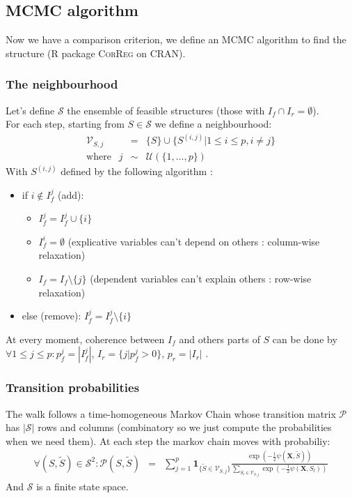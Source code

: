 \documentclass[11pt,a4paper]{article}
\begin{document}

\subsection{MCMC algorithm}
	Now we have a comparison criterion, we define an MCMC algorithm to find the structure (R package \textsc{CorReg} on CRAN). 
	\subsubsection{The neighbourhood}
	Let's define $\mathcal{S}$ the ensemble of feasible structures (those with $I_f\cap I_r=\emptyset$).
	\\
	For each step, starting from $S \in \mathcal{S}$ we define a neighbourhood:
		\begin{eqnarray}
		\mathcal{V}_{S,j}&=& \{S \}\cup \{ S^{(i,j)} |1\leq i \leq p, i\neq j  \} \\
		\textrm{where }\ \ j &\sim & \mathcal{U}(\{1,\dots,p\}) 
	\end{eqnarray}	
	With $S^{(i,j)}$ defined by the following algorithm :
	\begin{itemize}
		\item if $i \notin I_f^j$ (add): 
			\begin{itemize}
				\item $I_f^j=I_f^j\cup \{i\}$
				\item $I_f^i=\emptyset$ (explicative variables can't depend on others : column-wise relaxation)
				\item $I_f=I_f \setminus \{j\}$ (dependent variables can't explain others : row-wise relaxation) 
			\end{itemize}			 
		\item else (remove): $I_f^j=I_f^j\setminus \{i\}$
	\end{itemize}
	
	\smallskip
	At every moment, coherence between $I_f$ and others parts of $S$ can be done by $\forall 1\leq j\leq p :  p_f^j=|I_f^j|$, $I_r=\{j |p_f^j>0 \}$, $p_r= |I_r|$ .
		
	\subsubsection{Transition probabilities}
	
	The walk follows a time-homogeneous Markov Chain whose transition matrix $\mathcal{P}$ has $|\mathcal{S}|$ rows and columns (combinatory so we just compute the probabilities when we need them).
	At each step the markov chain moves with probabiliy:
	\begin{eqnarray}
			\forall (S,\tilde{S}) \in \mathcal{S}^2 : \mathcal{P}(S,\tilde{S})&=&\sum_{j=1}^p \mathbf{1}_{ \{\tilde{S}\in \mathcal{V}_{S,j}\} }\frac{\exp(-\frac{1}{2}\psi(\boldsymbol{X},\tilde{S}))}{\sum_{S_l\in \mathcal{V}_{S,j}}\exp(-\frac{1}{2}\psi(\boldsymbol{X},S_l))} 
	\end{eqnarray}
	And $\mathcal{S}$ is a finite state space.%
	 
\end{document}
